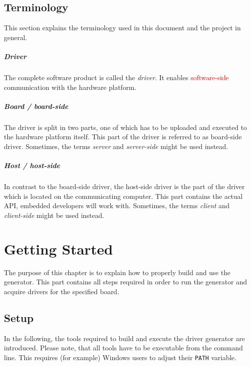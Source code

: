 \documentclass{report}
\begin{document}
\section{Terminology}
\label{sec:term}
This section explains the terminology used in this document and the project in general.

\paragraph{Driver}
The complete software product is called the \textit{driver}. It enables  \textcolor{red}{software-side} communication with the hardware platform.

\paragraph{Board / board-side}
The driver is split in two parts, one of which has to be uploaded and executed to the hardware platform itself. This part of the driver is referred to as board-side driver. Sometimes, the terms \textit{server} and \textit{server-side} might be used instead.

\paragraph{Host / host-side}
In contrast to the board-side driver, the host-side driver is the part of the driver which is located on the communicating computer. This part contains the actual API, embedded developers will work with. Sometimes, the terms \textit{client} and \textit{client-side} might be used instead.



\chapter{Getting Started}
\label{sec:start}
The purpose of this chapter is to explain how to properly build and use the generator. This part contains all steps required in order to run the generator and acquire drivers for the specified board.

\section{Setup}
\label{sec:setup}
In the following, the tools required to build and execute the driver generator are introduced. Please note, that all tools have to be executable from the command line. This requires (for example) Windows users to adjust their \texttt{PATH} variable.
\end{document}

